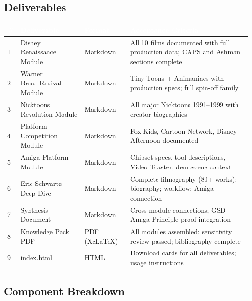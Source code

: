 \documentclass[11pt,letterpaper]{article}
\newcommand{\tableheader}[1]{\textbf{\sffamily\textcolor{white}{#1}}}
\begin{document}
\subsection{Deliverables}

\begin{center}
\begin{tabularx}{\textwidth}{C{0.5cm}L{3.5cm}L{3cm}X}
\toprule
{}
\tableheader{\#} & \tableheader{Deliverable} & \tableheader{Format} & \tableheader{Acceptance Criteria} \\
 & Disney Renaissance Module & Markdown & All 10 films documented with full production data; CAPS and Ashman sections complete \\
2 & Warner Bros.\ Revival Module & Markdown & Tiny Toons + Animaniacs with production specs; full spin-off family \\
3 & Nicktoons Revolution Module & Markdown & All major Nicktoons 1991--1999 with creator biographies \\
4 & Platform Competition Module & Markdown & Fox Kids, Cartoon Network, Disney Afternoon documented \\
5 & Amiga Platform Module & Markdown & Chipset specs, tool descriptions, Video Toaster, demoscene context \\
6 & Eric Schwartz Deep Dive & Markdown & Complete filmography (80+ works); biography; workflow; Amiga connection \\
7 & Synthesis Document & Markdown & Cross-module connections; GSD Amiga Principle proof integration \\
8 & Knowledge Pack PDF & PDF (XeLaTeX) & All modules assembled; sensitivity review passed; bibliography complete \\
9 & index.html & HTML & Download cards for all deliverables; usage instructions \\
\bottomrule
\end{tabularx}
\end{center}

\subsection{Component Breakdown}
\end{document}
